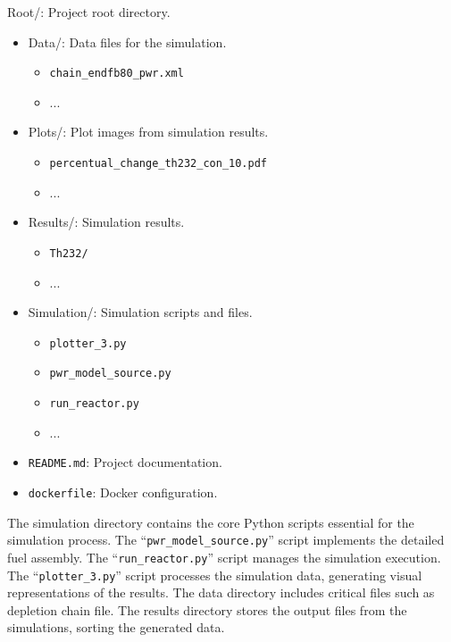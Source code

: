 \begin{tcolorbox}
    Root/: Project root directory.
    \begin{itemize}[itemsep=0pt, parsep=0pt]
        \item Data/: Data files for the simulation.
        \begin{itemize}[itemsep=0pt, parsep=0pt]
            \item \texttt{chain\_endfb80\_pwr.xml}
            \item ...
        \end{itemize}
        \item Plots/: Plot images from simulation results.
        \begin{itemize}[itemsep=0pt, parsep=0pt]
            \item \texttt{percentual\_change\_th232\_con\_10.pdf}
            \item ...
        \end{itemize}
        \item Results/: Simulation results.
        \begin{itemize}[itemsep=0pt, parsep=0pt]
            \item \texttt{Th232/}
            \item ...
        \end{itemize}
        \item Simulation/: Simulation scripts and files.
        \begin{itemize}[itemsep=0pt, parsep=0pt]
            \item \texttt{plotter\_3.py}
            \item \texttt{pwr\_model\_source.py}
            \item \texttt{run\_reactor.py}
            \item ...
        \end{itemize}
        \item \texttt{README.md}: Project documentation.
        \item \texttt{dockerfile}: Docker configuration.
    \end{itemize}
\end{tcolorbox}

The simulation directory contains the core Python scripts essential for the simulation process. The ``\texttt{pwr\_model\_source.py}'' script implements the detailed fuel assembly. The ``\texttt{run\_reactor.py}'' script manages the simulation execution. The ``\texttt{plotter\_3.py}'' script processes the simulation data, generating visual representations of the results. The data directory includes critical files such as depletion chain file. The results directory stores the output files from the simulations, sorting the generated data. 

